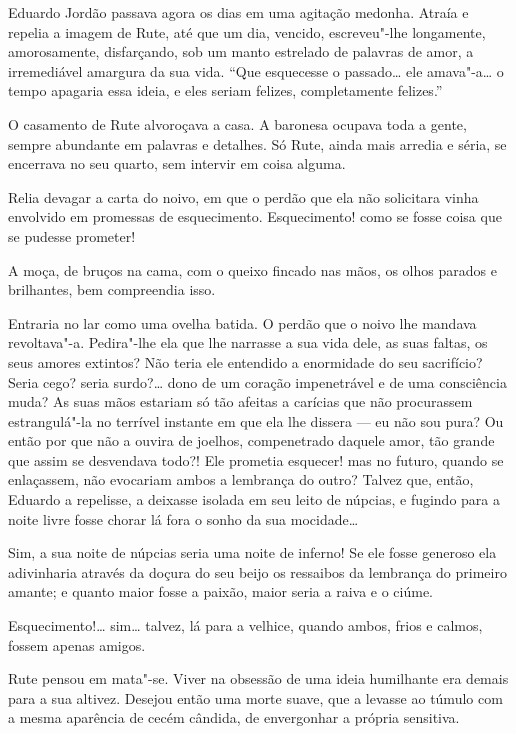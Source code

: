 Eduardo Jordão passava agora os dias em uma agitação medonha. Atraía e
repelia a imagem de Rute, até que um dia, vencido, escreveu"-lhe
longamente, amorosamente, disfarçando, sob um manto estrelado de
palavras de amor, a irremediável amargura da sua vida. ``Que esquecesse
o passado\ldots{} ele amava"-a\ldots{} o tempo apagaria essa ideia, e eles seriam
felizes, completamente felizes.''

O casamento de Rute alvoroçava a casa. A baronesa ocupava toda a gente,
sempre abundante em palavras e detalhes. Só Rute, ainda mais arredia e
séria, se encerrava no seu quarto, sem intervir em coisa alguma.

Relia devagar a carta do noivo, em que o perdão que ela não solicitara
vinha envolvido em promessas de esquecimento. Esquecimento! como se
fosse coisa que se pudesse prometer!

A moça, de bruços na cama, com o queixo fincado nas mãos, os olhos
parados e brilhantes, bem compreendia isso.

Entraria no lar como uma ovelha batida. O perdão que o noivo lhe mandava
revoltava"-a. Pedira"-lhe ela que lhe narrasse a sua vida dele, as suas
faltas, os seus amores extintos? Não teria ele entendido a enormidade do
seu sacrifício? Seria cego? seria surdo?\ldots{} dono de um coração
impenetrável e de uma consciência muda? As suas mãos estariam só tão
afeitas a carícias que não procurassem estrangulá"-la no terrível
instante em que ela lhe dissera --- eu não sou pura? Ou então por que
não a ouvira de joelhos, compenetrado daquele amor, tão grande que assim
se desvendava todo?! Ele prometia esquecer! mas no futuro, quando se
enlaçassem, não evocariam ambos a lembrança do outro? Talvez que, então,
Eduardo a repelisse, a deixasse isolada em seu leito de núpcias, e
fugindo para a noite livre fosse chorar lá fora o sonho da sua
mocidade\ldots{}

Sim, a sua noite de núpcias seria uma noite de inferno! Se ele fosse
generoso ela adivinharia através da doçura do seu beijo os ressaibos da
lembrança do primeiro amante; e quanto maior fosse a paixão, maior seria
a raiva e o ciúme.

Esquecimento!\ldots{} sim\ldots{} talvez, lá para a velhice, quando ambos, frios e
calmos, fossem apenas amigos.

Rute pensou em mata"-se. Viver na obsessão de uma ideia humilhante era
demais para a sua altivez. Desejou então uma morte suave, que a levasse
ao túmulo com a mesma aparência de cecém cândida, de envergonhar a
própria sensitiva.

